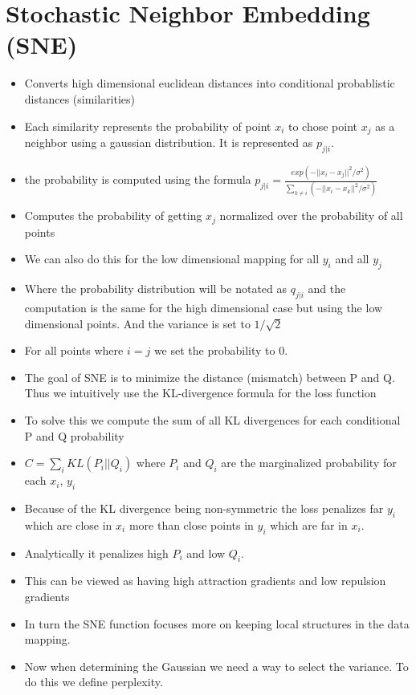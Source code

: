 \documentclass[11pt]{article}
\begin{document}
\section{Stochastic Neighbor Embedding (SNE)}
\label{sec:orge00d24f}
\begin{itemize}
\item Converts high dimensional euclidean distances into conditional probablistic distances (similarities)
\item Each similarity represents the probability of point \(x_i\) to chose point \(x_j\) as a neighbor using a gaussian distribution. It is represented as \(p_{j|i}\).
\item the probability is computed using the formula \(p_{j|i} = \frac{exp(-||x_i-x_j||^2/\sigma^2)}{\sum_{k \neq i}(-||x_i - x_k||^2/\sigma^2)}\)
\item Computes the probability of getting \(x_j\) normalized over the probability of all points
\item We can also do this for the low dimensional mapping for all \(y_i\) and all \(y_j\)
\item Where the probability distribution will be notated as \(q_{j|i}\) and the computation is the same for the high dimensional case but using the low dimensional points. And the variance is set to \(1/\sqrt2\)
\item For all points where \(i=j\) we set the probability to 0.
\item The goal of SNE is to minimize the distance (mismatch) between P and Q. Thus we intuitively use the KL-divergence formula for the loss function
\item To solve this we compute the sum of all KL divergences for each conditional P and Q probability
\item \(C = \sum_iKL(P_i||Q_i)\) where \(P_i\) and \(Q_i\) are the marginalized probability for each \(x_i\), \(y_i\)
\item Because of the KL divergence being non-symmetric the loss penalizes far \(y_i\) which are close in \(x_i\) more than close points in \(y_i\) which are far in \(x_i\).
\item Analytically it penalizes high \(P_i\) and low \(Q_i\).
\item This can be viewed as having high attraction gradients and low repulsion gradients
\item In turn the SNE function focuses more on keeping local structures in the data mapping.
\item Now when determining the Gaussian we need a way to select the variance. To do this we define perplexity.

\end{itemize}
\end{document}
